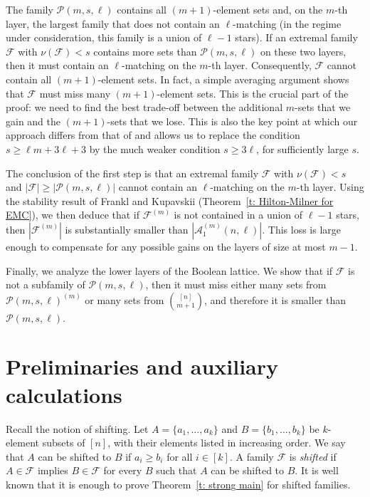 \documentclass{article}
\begin{document}
The family $\mathcal{P}(m, s, \ell)$ contains all $(m+1)$-element sets and, on the $m$-th layer, the largest family that does not contain an $\ell$-matching (in the regime under consideration, this family is a union of $\ell-1$ stars). If an extremal family $\mathcal{F}$ with $\nu(\mathcal{F})<s$ contains more sets than $\mathcal{P}(m, s, \ell)$ on these two layers, then it must contain an $\ell$-matching on the $m$-th layer. Consequently, $\mathcal{F}$ cannot contain all $(m+1)$-element sets. In fact, a simple averaging argument shows that $\mathcal{F}$ must miss many $(m+1)$-element sets. This is the crucial part of the proof: we need to find the best trade-off between the additional $m$-sets that we gain and the $(m+1)$-sets that we lose. This is also the key point at which our approach differs from that of \cite{FK9} and allows us to replace the condition $s \geq \ell m + 3\ell + 3$ by the much weaker condition $s \geq 3\ell$, for sufficiently large $s$.

The conclusion of the first step is that an extremal family $\mathcal{F}$ with $\nu(\mathcal{F}) < s$ and $|\mathcal{F}| \geq |\mathcal{P}(m, s, \ell)|$ cannot contain an $\ell$-matching on the $m$-th layer. Using the stability result of Frankl and Kupavskii (Theorem~\ref{t: Hilton-Milner for EMC}), we then deduce that if $\mathcal{F}^{(m)}$ is not contained in a union of $\ell-1$ stars, then $|\mathcal{F}^{(m)}|$ is substantially smaller than $|\mathcal{A}_{1}^{(m)}(n, \ell)|$. This loss is large enough to compensate for any possible gains on the layers of size at most $m-1$.

Finally, we analyze the lower layers of the Boolean lattice. We show that if $\mathcal{F}$ is not a subfamily of $\mathcal{P}(m, s, \ell)$, then it must miss either many sets from $\mathcal{P}(m, s, \ell)^{(m)}$ or many sets from ${[n] \choose m + 1}$, and therefore it is smaller than $\mathcal{P}(m, s, \ell)$.



\section{Preliminaries and auxiliary calculations}\label{sec3}

Recall the notion of shifting. Let $A = \{a_1, \ldots, a_k\}$ and $B = \{b_1, \ldots, b_k\}$ be $k$-element subsets of $[n]$, with their elements listed in increasing order. We say that $A$ can be shifted to $B$ if $a_i \geq b_i$ for all $i \in [k]$. A family $\mathcal{F}$ is {\it shifted} if $A \in \mathcal{F}$ implies $B \in \mathcal{F}$ for every $B$ such that $A$ can be shifted to $B$. It is well known \cite{F3} that it is enough to prove Theorem~\ref{t: strong main} for shifted families.
\end{document}
